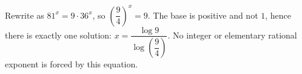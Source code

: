 Rewrite as $81^x=9\cdot36^x$, so $\left(\dfrac{9}{4}\right)^x=9$. The base is positive and not $1$, hence there is exactly one solution: $\boxed{x = \dfrac{\log9}{\log (\dfrac{9}{4})}}$. No integer or elementary rational exponent is forced by this equation.

